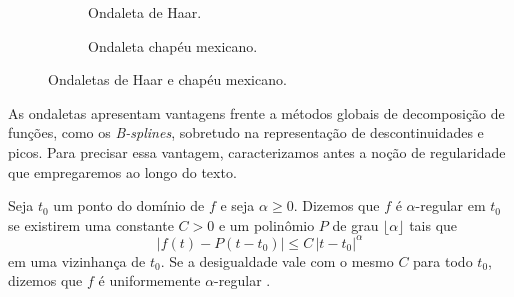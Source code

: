 \begin{figure}[!ht]
	\centering
	\begin{subfigure}{0.48\textwidth}
    	\centering
    	\caption{Ondaleta de Haar.}
	    \label{fig:onda_haar}
	\end{subfigure}
	\hfill
	\begin{subfigure}{0.48\textwidth}
    	\centering
    	\caption{Ondaleta chapéu mexicano.}
	    \label{fig:onda_mexican_hat}
	\end{subfigure}
	\caption{Ondaletas de Haar e chapéu mexicano.}
	\label{fig:onda_comparacao_seno_mexican_hat}
\end{figure}

As ondaletas apresentam vantagens frente a métodos globais de decomposição de funções, como os \emph{B-splines}, sobretudo na representação de descontinuidades e picos.
Para precisar essa vantagem, caracterizamos antes a noção de regularidade que empregaremos ao longo do texto.

\begin{definition}\label{def:regularidade}
    Seja \(t_0\) um ponto do domínio de \(f\) e seja \(\alpha \geq 0\). Dizemos que \(f\) é \(\alpha\)-regular em \(t_0\) se existirem uma constante \(C > 0\) e um polinômio \(P\) de grau \(\lfloor \alpha \rfloor\) tais que
    \[
        |f(t) - P(t - t_0)| \leq C\,|t - t_0|^{\alpha}
    \]
    em uma vizinhança de \(t_0\).
    Se a desigualdade vale com o mesmo \(C\) para todo \(t_0\), dizemos que \(f\) é uniformemente \(\alpha\)-regular \cite{mallat_wavelet_2009}.
\end{definition}

